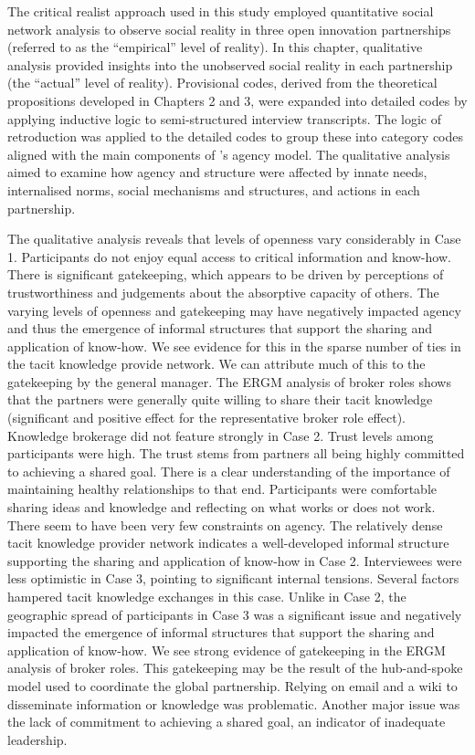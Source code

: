 The critical realist approach used in this study employed quantitative social network analysis to observe social reality in three open innovation partnerships (referred to as the \enquote{empirical} level of reality). In this chapter, qualitative analysis provided insights into the unobserved social reality in each partnership (the \enquote{actual} level of reality). Provisional codes, derived from the theoretical propositions developed in Chapters 2 and 3, were expanded into detailed codes by applying inductive logic to semi-structured interview transcripts. The logic of retroduction was applied to the detailed codes to group these into category codes aligned with the main components of \citeauthor{loyal2001agency}'s \citeyearpar{loyal2001agency}  agency model. The qualitative analysis aimed to examine how agency and structure were affected by innate needs, internalised norms, social mechanisms and structures, and actions in each partnership. \medskip

The qualitative analysis reveals that levels of openness vary considerably in Case 1. Participants do not enjoy equal access to critical information and know-how. There is significant gatekeeping, which appears to be driven by perceptions of trustworthiness and judgements about the absorptive capacity of others. The varying levels of openness and gatekeeping may have negatively impacted agency and thus the emergence of informal structures that support the sharing and application of know-how. We see evidence for this in the sparse number of ties in the tacit knowledge provide network. We can attribute much of this to the gatekeeping by the general manager. The ERGM analysis of broker roles shows that the partners were generally quite willing to share their tacit knowledge (significant and positive effect for the representative broker role effect). Knowledge brokerage did not feature strongly in Case 2. Trust levels among participants were high. The trust stems from partners all being highly committed to achieving a shared goal. There is a clear understanding of the importance of maintaining healthy relationships to that end. Participants were comfortable sharing ideas and knowledge and reflecting on what works or does not work. There seem to have been very few constraints on agency. The relatively dense tacit knowledge provider network indicates a well-developed informal structure supporting the sharing and application of know-how in Case 2. Interviewees were less optimistic in Case 3, pointing to significant internal tensions. Several factors hampered tacit knowledge exchanges in this case. Unlike in Case 2, the geographic spread of participants in Case 3 was a significant issue and negatively impacted the emergence of informal structures that support the sharing and application of know-how. We see strong evidence of gatekeeping in the ERGM analysis of broker roles. This gatekeeping may be the result of the hub-and-spoke model used to coordinate the global partnership. Relying on email and a wiki to disseminate information or knowledge was problematic. Another major issue was the lack of commitment to achieving a shared goal, an indicator of inadequate leadership. \medskip  

